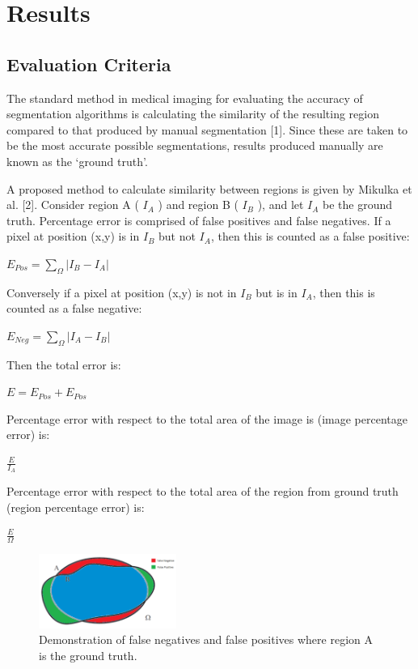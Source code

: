 \documentclass{article}
\begin{document}
	\section{Results}
		\subsection{Evaluation Criteria}
		The standard method in medical imaging for evaluating the accuracy of segmentation algorithms is calculating the similarity of the resulting region compared to that produced by manual segmentation [1]. Since these are taken to be the most accurate possible segmentations, results produced manually are known as the ‘ground truth’.

		A proposed method to calculate similarity between regions is given by Mikulka et al. [2]. Consider region A ( $I_{A}$ ) and region B ( $I_{B}$ ), and let $I_{A}$ be the ground truth. Percentage error is comprised of false positives and false negatives. If a pixel at position (x,y) is in $I_{B}$ but not $I_{A}$, then this is counted as a false positive:
		
		\begin{center} $E_{Pos} = \sum_{\Omega } |I_{B} - I_{A}|$ \end{center}
		
		Conversely if a pixel at position (x,y) is not in $I_{B}$ but is in $I_{A}$, then this is counted as a false negative:   
		
		\begin{center} $E_{Neg} = \sum_{\Omega } |I_{A} - I_{B}|$ \end{center}
		
		Then the total error is:
		
		\begin{center} $E = E_{Pos} + E_{Pos}$ \end{center}
		
		Percentage error with respect to the total area of the image is (image percentage error) is:
		
		\begin{center} $\frac{E}{I_{A}}$ \end{center}
		
		Percentage error with respect to the total area of the region from ground truth (region percentage error) is:
		
		\begin{center} $\frac{E}{\Omega}$ \end{center}

		\begin{figure}[H]
		\centering
		\includegraphics[width=0.4\textwidth]{Mandy/FalsePosFalseNeg.png}
		\caption{Demonstration of false negatives and false positives where region A is the ground truth.}
		\label{fig:falsePosFalseNeg}
		\end{figure}
\end{document}
